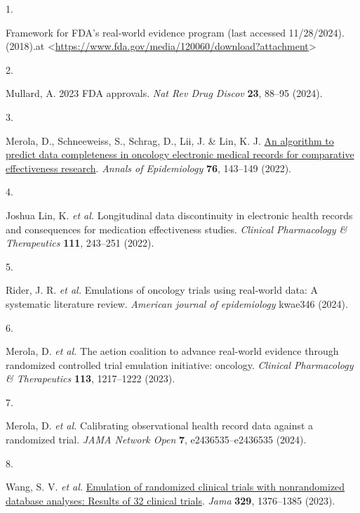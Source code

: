 \documentclass[
  letterpaper,
  DIV=11,
  numbers=noendperiod]{scrartcl}
\newlength{\cslhangindent}
\newlength{\csllabelwidth}
\newenvironment{CSLReferences}[2] %
 {\begin{list}{}{%
  \setlength{\itemindent}{0pt}
  \setlength{\leftmargin}{0pt}
  \setlength{\parsep}{0pt}
  \ifodd #1
   \setlength{\leftmargin}{\cslhangindent}
   \setlength{\itemindent}{-1\cslhangindent}
  \fi
  \setlength{\itemsep}{#2\baselineskip}}}
 {\end{list}}
\newcommand{\CSLLeftMargin}[1]{\parbox[t]{\csllabelwidth}{\strut#1\strut}}
\newcommand{\CSLRightInline}[1]{\parbox[t]{\linewidth - \csllabelwidth}{\strut#1\strut}}
\begin{document}
\label{refs}
\begin{CSLReferences}{0}{0}
\CSLLeftMargin{1. }%
\CSLRightInline{Framework for FDA's real-world evidence program (last
accessed 11/28/2024). (2018).at
\textless{}\url{https://www.fda.gov/media/120060/download?attachment}\textgreater{}}

\CSLLeftMargin{2. }%
\CSLRightInline{Mullard, A. 2023 FDA approvals. \emph{Nat Rev Drug
Discov} \textbf{23}, 88--95 (2024).}

\CSLLeftMargin{3. }%
\CSLRightInline{Merola, D., Schneeweiss, S., Schrag, D., Lii, J. \& Lin,
K. J. \href{https://doi.org/10.1016/j.annepidem.2022.07.007}{An
algorithm to predict data completeness in oncology electronic medical
records for comparative effectiveness research}. \emph{Annals of
Epidemiology} \textbf{76}, 143--149 (2022).}

\CSLLeftMargin{4. }%
\CSLRightInline{Joshua Lin, K. \emph{et al.} Longitudinal data
discontinuity in electronic health records and consequences for
medication effectiveness studies. \emph{Clinical Pharmacology \&
Therapeutics} \textbf{111}, 243--251 (2022).}

\CSLLeftMargin{5. }%
\CSLRightInline{Rider, J. R. \emph{et al.} Emulations of oncology trials
using real-world data: A systematic literature review. \emph{American
journal of epidemiology} kwae346 (2024).}

\CSLLeftMargin{6. }%
\CSLRightInline{Merola, D. \emph{et al.} The aetion coalition to advance
real-world evidence through randomized controlled trial emulation
initiative: oncology. \emph{Clinical Pharmacology \& Therapeutics}
\textbf{113}, 1217--1222 (2023).}

\CSLLeftMargin{7. }%
\CSLRightInline{Merola, D. \emph{et al.} Calibrating observational
health record data against a randomized trial. \emph{JAMA Network Open}
\textbf{7}, e2436535--e2436535 (2024).}

\CSLLeftMargin{8. }%
\CSLRightInline{Wang, S. V. \emph{et al.}
\href{https://doi.org/10.1001/jama.2023.4221}{Emulation of randomized
clinical trials with nonrandomized database analyses: Results of 32
clinical trials}. \emph{Jama} \textbf{329}, 1376--1385 (2023).}


\end{CSLReferences}
\end{document}
